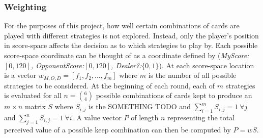 

\subsubsection{Weighting}



For the purposes of this project,
how well certain combinations of cards are played with different strategies
is not explored.
%
Instead, only the player's position in score-space affects the decision as to
which strategies to play by.
%
Each possible score-space coordinate can be thought of as a coordinate defined
by (\textit{MyScore:$[0,120]$, OpponentScore:$[0,120]$, Dealer?:$\{0,1\}$}).
%
At each score-space location is a vector $w_{M,O,D} = [f_1, f_2,\ldots,f_m]$
where $m$ is the number of all possible strategies to be considered.
%
At the beginning of each round, each of $m$ strategies is evaluated for all
$n = {6 \choose 4}$ possible combinations of cards kept to produce an
$m \times n$ matrix $S$
where $S_{i,j}$ is the SOMETHING TODO
and $\sum_{i=1}^{m} S_{i,j} = 1\ \forall j$
and $\sum_{j=1}^{n} S_{i,j} = 1\ \forall i$.
%
A value vector $P$ of length $n$ representing the total perceived value of a
possible keep combination
can then be computed by
$P = w S$.
%


